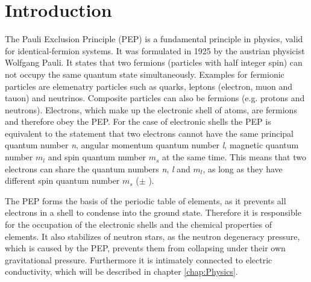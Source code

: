 \chapter{Introduction}
\label{chap:Introuction}


The Pauli Exclusion Principle (PEP) is a fundamental principle in physics, valid for identical-fermion systems. It was formulated in 1925 by the austrian physicist Wolfgang Pauli. It states that two fermions (particles with half integer spin) can not occupy the same quantum state simultaneously. Examples for fermionic particles are elemenatry particles such as quarks, leptons (electron, muon and tauon) and neutrinos. Composite particles can also be fermions (e.g. protons and neutrons). Electrons, which make up the electronic shell of atoms, are fermions and therefore obey the PEP. For the case of electronic shells the PEP is equivalent to the statement that two electrons cannot have the same principal quantum number \textit{n}, angular momentum quantum number \textit{l}, magnetic quantum number \textit{$m_{l}$} and spin quantum number \textit{$m_{s}$} at the same time. This means that two electrons can share the quantum numbers \textit{n}, \textit{l} and \textit{$m_{l}$}, as long as they have different spin quantum number \textit{$m_{s}$} ($\pm$ \textonehalf).

The PEP forms the basis of the periodic table of elements, as it prevents all electrons in a shell to condense into the ground state. Therefore it is responsible for the occupation of the electronic shells and the chemical properties of elements. It also stabilizes of neutron stars, as the neutron degeneracy pressure, which is caused by the PEP, prevents them from collapsing under their own gravitational pressure. Furthermore it is intimately connected to electric conductivity, which will be described in chapter \ref{chap:Physics}.

